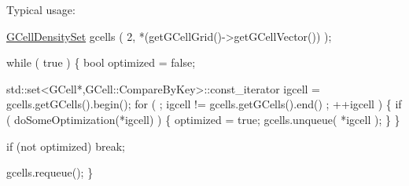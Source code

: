 Typical usage\-: 
\begin{DoxyCode}
\hyperlink{classKatabatic_1_1GCellDensitySet_ad74cbb404ad28f734f5759462aa9f363}{GCellDensitySet} gcells ( 2, *(getGCellGrid()->getGCellVector()) );

\textcolor{keywordflow}{while} ( \textcolor{keyword}{true} ) \{
    \textcolor{keywordtype}{bool} optimized = \textcolor{keyword}{false};

    std::set<GCell*,GCell::CompareByKey>::const\_iterator igcell = gcells.getGCells().begin();
    \textcolor{keywordflow}{for} ( ; igcell != gcells.getGCells().end() ; ++igcell ) \{
        \textcolor{keywordflow}{if} ( doSomeOptimization(*igcell) ) \{
          optimized = \textcolor{keyword}{true};
          gcells.unqueue( *igcell );
        \}
    \}

    \textcolor{keywordflow}{if} (not optimized) \textcolor{keywordflow}{break};

    gcells.requeue();
\}
\end{DoxyCode}
 

